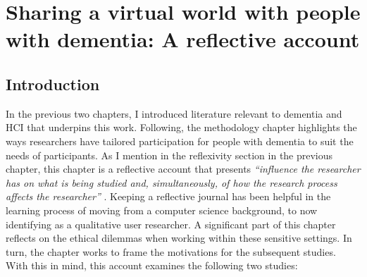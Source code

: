 \chapter{Sharing a virtual world with people with dementia: A reflective account}
\label{NegotatingReseacherParticipantRelationships}

\section{Introduction}
\label{CH4:Intro}
In the previous two chapters, I introduced literature relevant to dementia and HCI that underpins this work. Following, the methodology chapter highlights the ways researchers have tailored participation for people with dementia to suit the needs of participants. As I mention in the reflexivity section in the previous chapter, this chapter is a reflective account that presents \textit{``influence the researcher has on what is being studied and, simultaneously, of how the research process affects the researcher''} \citep{probst2014double}. Keeping a reflective journal has been helpful in the learning process of moving from a computer science background, to now identifying as a qualitative user researcher. A significant part of this chapter reflects on the ethical dilemmas when working within these sensitive settings. In turn, the chapter works to frame the motivations for the subsequent studies. With this in mind, this account examines the following two studies: 

